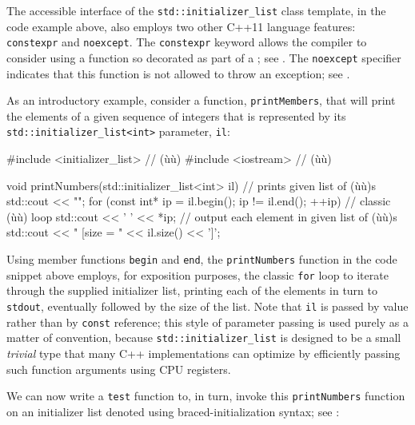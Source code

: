 The accessible interface of the \lstinline!std::initializer_list! class
template, in the code example above, also employs two other C++11
language features: \lstinline!constexpr! and \lstinline!noexcept!. The
\lstinline!constexpr! keyword allows the compiler to consider using a
function so decorated as part of a ; see . The \lstinline!noexcept!
specifier indicates that this function is not allowed to throw an
exception; see .

As an introductory example, consider a function, \lstinline!printMembers!,
that will print the elements of a given sequence of integers that is
represented by its \lstinline!std::initializer_list<int>! parameter,
\lstinline!il!:

\begin{emcppslisting}
#include <initializer_list>  // (ù{}ù)
#include <iostream>          // (ù{}ù)

void printNumbers(std::initializer_list<int> il)  // prints given list of (ù{}ù)s
{
    std::cout << "{";
    for (const int* ip = il.begin(); ip != il.end(); ++ip)  // classic (ù{}ù) loop
    {
        std::cout << ' ' << *ip;  // output each element in given list of (ù{}ù)s
    }
    std::cout << " } [size = " << il.size() << ']';
}
\end{emcppslisting}
    

\noindent Using member functions \lstinline!begin! and \lstinline!end!, the
\lstinline!printNumbers! function in the code snippet above employs, for
exposition purposes, the classic \lstinline!for! loop to iterate through
the supplied initializer list, printing each of the elements in turn to
\lstinline!stdout!, eventually followed by the size of the list. Note that
\lstinline!il! is passed by value rather than by \lstinline!const! reference;
this style of parameter passing is used purely as a matter of
convention, because \lstinline!std::initializer_list! is designed to be a
small \emph{trivial} type that many C++ implementations can optimize by
efficiently passing such function arguments using CPU registers.

We can now write a \lstinline!test! function to, in turn, invoke this
\lstinline!printNumbers! function on an initializer list denoted using
braced-initialization syntax; see : 

